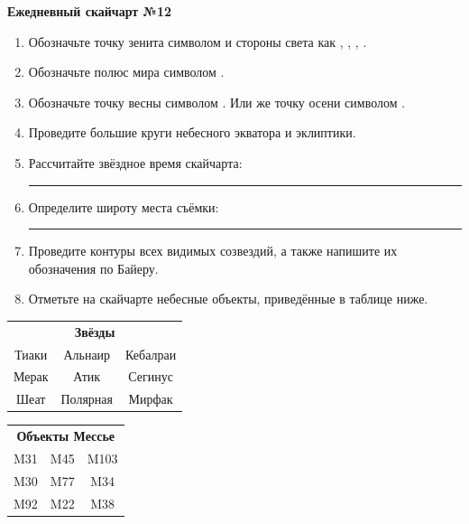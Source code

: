 \documentclass{./SAS-class-skygen}
\begin{document}
    
    
    
	\begin{center}
		\large\textbf{Ежедневный скайчарт №12}
	\end{center}

	\begin{enumerate}
		\item Обозначьте точку зенита символом  и стороны света как , , , .
		\item Обозначьте полюс мира символом .
		\item Обозначьте точку весны символом \Aries. Или же точку осени символом \Libra.
		\item Проведите большие круги небесного экватора и эклиптики.
		\item Рассчитайте звёздное время скайчарта: \rule{2cm}{0.4pt}
		\item Определите широту места съёмки: \rule{2cm}{0.4pt}
		\item Проведите контуры всех видимых созвездий, а также напишите их обозначения по Байеру.
		\item Отметьте на скайчарте небесные объекты, приведённые в таблице ниже.
	\end{enumerate}
	
    \vspace{0.5cm}

    \begin{table}[h!]
    \centering
    \begin{tabular}{ccc}
    \multicolumn{3}{c}{\textbf{Звёзды}} \\ Тиаки & Альнаир & Кебалраи \\
Мерак & Атик & Сегинус \\
Шеат & Полярная & Мирфак \\

\end{tabular}
    \hfill
    \begin{tabular}{ccc}
    \multicolumn{3}{c}{\textbf{Объекты Мессье}} \\ M31 & M45 & M103 \\
M30 & M77 & M34 \\
M92 & M22 & M38 \\

\end{tabular}
    \end{table}
	
\end{document}
